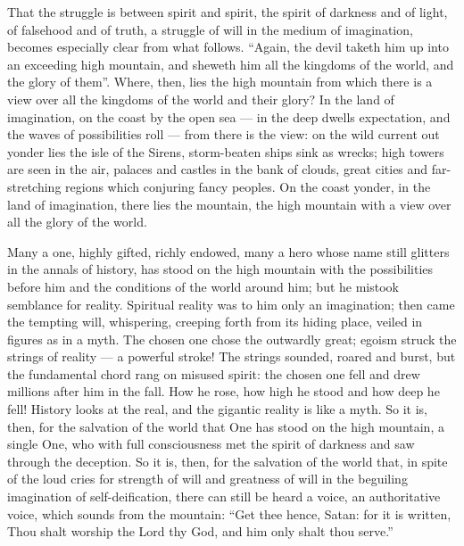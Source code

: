 \documentclass[12pt,a4paper,openany]{book}
\newcommand{\opage}[1]{\marginnote{\footnotesize\textit{[#1]}}}
\begin{document}
That the struggle is between spirit and spirit, the spirit of darkness and of
light, of falsehood and of truth, a struggle of will in
the medium of imagination, becomes especially clear from what
follows. ``Again, the devil taketh him up into an exceeding
high mountain, and sheweth him all the kingdoms of the world, and the
glory of them''. Where, then, lies the high mountain from which
there is a view over all the kingdoms of the world and their glory?
In the land of imagination, on the coast by the open
sea --- in the deep dwells expectation, and the waves of possibilities
roll --- from there is the view: on the wild current
out yonder lies the isle of the Sirens, storm-beaten ships sink
as wrecks; high towers are seen in the air, palaces and castles
in the bank of clouds, great cities and far-stretching regions which
conjuring fancy peoples. On the coast yonder, in
the land of imagination, there lies the mountain, the high mountain
with a view over all the glory of the world.

\setcounter{footnote}{0}%
\opage{65}Many a one, highly gifted, richly endowed, many a
hero whose name still glitters in the annals of history, has
stood on the high mountain with the possibilities before him
and the conditions of the world around him; but he mistook
semblance for reality. Spiritual reality was to him only
an imagination; then came the tempting will, whispering,
creeping forth from its hiding place, veiled in figures as in a myth.
The chosen one chose the outwardly great; egoism struck
the strings of reality --- a powerful stroke! The strings
sounded, roared and burst, but the fundamental chord rang on
misused spirit: the chosen one fell and drew millions
after him in the fall. How he rose, how high he
stood and how deep he fell! History looks at the
real, and the gigantic reality is like a
myth. So it is, then, for the salvation of the world that One has
stood on the high mountain, a single One, who with full
consciousness met the spirit of darkness and saw through the deception.
So it is, then, for the salvation of the world that, in spite of
the loud cries for strength of will and greatness of will in the beguiling imagination
of self-deification, there can still be heard a
voice, an authoritative voice, which sounds from the mountain:
``Get thee hence, Satan: for it is written, Thou shalt worship
the Lord thy God, and him only shalt thou serve.''
\end{document}
